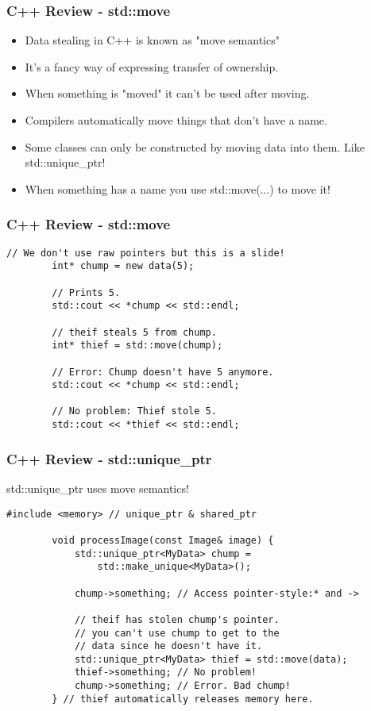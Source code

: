 \documentclass{beamer}
\begin{document}
\begin{frame}
	\frametitle{C++ Review - std::move}
	\begin{itemize}
		\item Data stealing in C++ is known as "move semantics"
		\item It's a fancy way of expressing transfer of ownership.
		\item When something is "moved" it can't be used after moving.
		\item Compilers automatically move things that don't have a name.
		\item Some classes can only be constructed by moving data into them. Like std::unique\_ptr!
		\item When something has a name you use std::move(...) to move it!
	\end{itemize}
\end{frame}

\begin{frame}[fragile]
	\frametitle{C++ Review - std::move}
	\begin{lstlisting}[language=nuclear]
		// We don't use raw pointers but this is a slide!
		int* chump = new data(5);

		// Prints 5.
		std::cout << *chump << std::endl;

		// theif steals 5 from chump.
		int* thief = std::move(chump);

		// Error: Chump doesn't have 5 anymore.
		std::cout << *chump << std::endl;

		// No problem: Thief stole 5.
		std::cout << *thief << std::endl;
	\end{lstlisting}
\end{frame}

\begin{frame}[fragile]
	\frametitle{C++ Review - std::unique\_ptr}

	std::unique\_ptr uses move semantics!

	\begin{lstlisting}[language=nuclear]
		#include <memory> // unique_ptr & shared_ptr

		void processImage(const Image& image) {
		    std::unique_ptr<MyData> chump =
		        std::make_unique<MyData>();

		    chump->something; // Access pointer-style:* and ->

		    // theif has stolen chump's pointer.
		    // you can't use chump to get to the
		    // data since he doesn't have it.
		    std::unique_ptr<MyData> thief = std::move(data);
		    thief->something; // No problem!
		    chump->something; // Error. Bad chump!
		} // thief automatically releases memory here.
	\end{lstlisting}
\end{frame}
\end{document}
